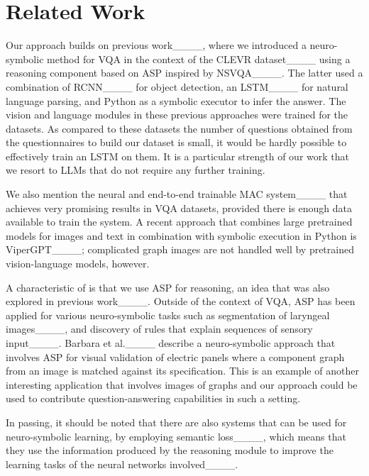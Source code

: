 \section{Related Work}
\label{sec:rel}

Our approach 
builds on previous work____, where we introduced a %
neuro-symbolic method for VQA in the context of the CLEVR dataset____
using a reasoning component based on ASP inspired by NSVQA____. The latter used a combination of RCNN____ for object detection, an LSTM____ for natural language parsing, and Python as a symbolic executor to infer the answer. 
The vision and language modules in these previous approaches were trained for the datasets. 
As compared to these datasets the number of questions obtained from the questionnaires to build our dataset is small, it would be hardly possible to effectively train an %
LSTM on them. 
It is a particular strength of our work that we resort to LLMs that do not require any further training.

We also mention the neural and end-to-end trainable MAC system____ that achieves very promising results in VQA datasets, provided there is enough data available to train the system.
A recent approach that combines large pretrained models for images and text in combination with symbolic execution in Python is ViperGPT____; complicated graph images
are not handled well by pretrained vision-language models, however.

A characteristic of \ours is that we use ASP for reasoning, an
idea that was also explored in previous work____.
Outside of the context of VQA, ASP has been applied for various neuro-symbolic tasks such as
segmentation of laryngeal images____, and discovery of rules that explain sequences of sensory input____. 
Barbara et al.____ describe a neuro-symbolic approach that involves ASP for visual validation of electric panels where a component graph from an image is matched against its specification. This is an example of another interesting application that involves images of graphs and our approach could be used to contribute question-answering capabilities in such a setting.

In passing, it should be noted that there are also systems that can be used for neuro-symbolic learning, \egc by employing semantic loss____, which means that they use the information produced by the reasoning module to improve the learning tasks of the neural networks involved____.

